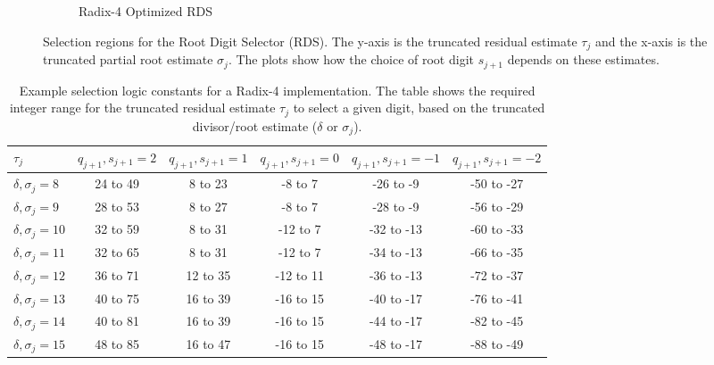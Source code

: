 \documentclass{article}
\begin{document}
\begin{figure}[htbp]
\begin{subfigure}[b]{0.32\textwidth}
    \caption{Radix-4 Optimized RDS}
    \label{fig:sqrt:radix4_optimized}
  \end{subfigure}
  \caption{Selection regions for the Root Digit Selector (RDS). The y-axis is the truncated residual estimate $\tau_j$ and the x-axis is the truncated partial root estimate $\sigma_j$. The plots show how the choice of root digit $s_{j+1}$ depends on these estimates.}
  \label{fig:sqrt:rds}
\end{figure}

\begin{table}[htbp]
  \centering
  \caption{Example selection logic constants for a Radix-4 implementation. The table shows the required integer range for the truncated residual estimate $\tau_j$ to select a given digit, based on the truncated divisor/root estimate ($\delta$ or $\sigma_j$).}
  \label{tab:radix4-logic-example}
  \begin{tabular}{@{}lccccc@{}}
    \toprule
    \textbf{$\tau_j$} & \textbf{$q_{j+1}, s_{j+1} = 2$} & \textbf{$q_{j+1}, s_{j+1} = 1$} & \textbf{$q_{j+1}, s_{j+1} = 0$} & \textbf{$q_{j+1}, s_{j+1} = -1$} & \textbf{$q_{j+1}, s_{j+1} = -2$} \\
    \midrule
    $\delta, \sigma_j = 8$  & 24 to 49               & 8 to 23                & -8 to 7                & -26 to -9               & -50 to -27              \\
    $\delta, \sigma_j = 9$  & 28 to 53               & 8 to 27                & -8 to 7                & -28 to -9               & -56 to -29              \\
    $\delta, \sigma_j = 10$ & 32 to 59               & 8 to 31                & -12 to 7               & -32 to -13              & -60 to -33              \\
    $\delta, \sigma_j = 11$ & 32 to 65               & 8 to 31                & -12 to 7               & -34 to -13              & -66 to -35              \\
    $\delta, \sigma_j = 12$ & 36 to 71               & 12 to 35               & -12 to 11              & -36 to -13              & -72 to -37              \\
    $\delta, \sigma_j = 13$ & 40 to 75               & 16 to 39               & -16 to 15              & -40 to -17              & -76 to -41              \\
    $\delta, \sigma_j = 14$ & 40 to 81               & 16 to 39               & -16 to 15              & -44 to -17              & -82 to -45              \\
    $\delta, \sigma_j = 15$ & 48 to 85               & 16 to 47               & -16 to 15              & -48 to -17              & -88 to -49              \\
    \bottomrule
  \end{tabular}
\end{table}
\end{document}
